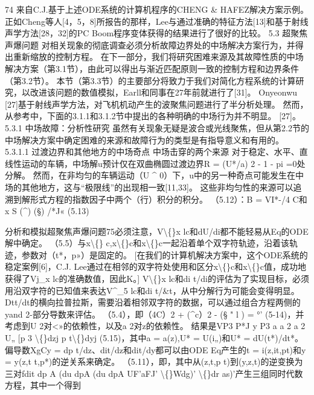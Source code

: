 \documentclass[UTF8,11pt,a4paper,openany,fontset=fandol]{ctexbook}
\begin{document}
74 来自C.J.基于上述ODE系统的计算机程序的CHENG \& HAFEZ解决方案示例。 正如Cheng等人[4，5，8]所报告的那样，Lee与通过准确的特征方法[13]和基于射线声学方法[28，32]的PC Boom程序变体获得的结果进行了很好的比较。 5.3 超聚焦声爆问题 对相关现象的彻底调查必须分析故障边界处的中场解决方案行为，并得出重新缩放的控制方程。 在下一部分，我们将研究困难来源及其故障性质的中场解决方案（第3.1节），由此可以得出与渐近匹配原则一致的控制方程和边界条件（第3.2节）。 本节（第3.3节）的主要部分将致力于我们对简化方程系统的计算研究，以改进该问题的数值模拟，Earll和同事在27年前就进行了[31]。 Onyeonwu [27]基于射线声学方法，对飞机机动产生的波聚焦问题进行了半分析处理。 然而，从参考中，下面的3.1.1和3.1.2节中提出的各种明确的中场行为并不明显。 [27]。 5.3.1 中场故障：分析性研究 虽然有关现象无疑是波合或光线聚焦，但从第2.2节的中场解决方案中确定困难的来源和故障行为的类型是有指导意义和有用的。 5.3.1.1 过渡边界和其他地方的中场奇点 中场击穿的两个来源 对于稳定、水平、直线性运动的车辆，中场解u预计仅在双曲椭圆过渡边界R = (U*/a) 2 - 1 - pi =0处分解。 然而，在非均匀的车辆运动（U \textasciicircum{} 0）下，u中的另一种奇点可能发生在中场的其他地方，这与“极限线”的出现相一致[11,33]。 这些非均匀性的来源可以追溯到解形式方程的指数因子中两个（行）积分的积分。 （5.12）：B = VI*-/4 C和x S (\textasciicircum{}) (§) /*J« (5.13)

分析和模拟超聚焦声爆问题75必须注意，V\textbackslash\{\}x lc和dU/di都不能轻易从Eq的ODE解中确定。 （5.5）与x\textbackslash\{\} c,x\textbackslash\{\}c和x\textbackslash\{\}c一起沿着单个双字符轨迹，沿着该轨迹，参数对（t*，p»）是固定的。 [在我们的计算机解决方案中，这个ODE系统的稳定案例[6]，C.J. Lee通过在相邻的双字符处使用和区分x\textbackslash\{\}c和x\textbackslash\{\}c值，成功地获得了Vj\_x lc的准确数值，因此K。] V\textbackslash\{\}x lc和di t/di的评估为了实现目标，必须用沿双字符的已知值来表达V\textasciicircum{}\_5 lc和di t/\&t，从中分解行为可能会变得明显。 Dtt/dt的横向拉普拉斯，需要沿着相邻双字符的数据，可以通过组合方程两侧的yand 2-部分导数来评估。 （5.4），即（4C）2 + (\textasciicircum{}c）2 - (§ " l ) = °' (5-14)，并考虑到U 2对<»的依赖性，以及a 2对z的依赖性。 结果是VP3 P*J y P3 a a 2 a 2 U„ [p 3 \textbackslash\{\}dzj p t\textbackslash\{\}dyj (5.15)，其中a = a(z),U* = U(i„)和U* = dU(t*)/dt*。 偏导数XgCy = dp t/dz、dit/dz和dit/dy都可以由ODE Eq产生的t = i(z,it,pt)和y = y(z,t t,p*)的逆关系来确定。 （5.11），即，其中从(z,t,p t)到(y,z,t)的逆变换为三对fdit dp A (du dpA (du dpA UF'aFJ' \textbackslash\{\}Wdg)' \textbackslash\{\}dr as)'产生三组同时代数方程，其中一个得到
\end{document}
